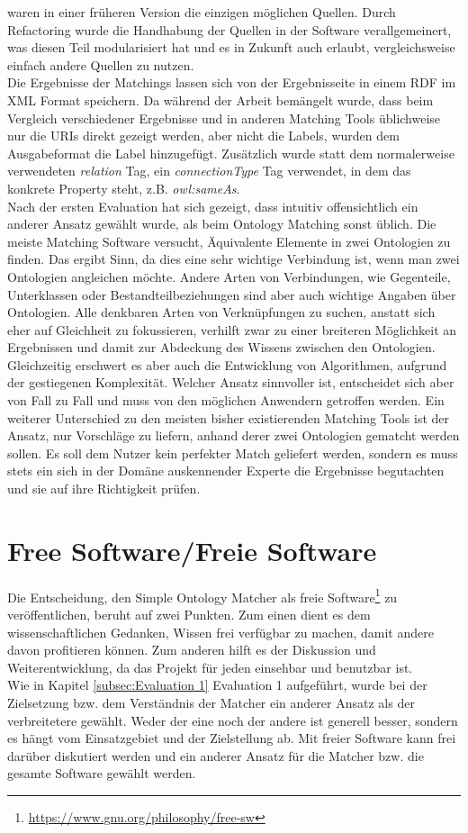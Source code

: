 waren in einer früheren Version die einzigen möglichen Quellen. Durch
Refactoring wurde die Handhabung der Quellen in der Software verallgemeinert,
was diesen Teil modularisiert hat und es in Zukunft auch erlaubt, vergleichsweise einfach andere
Quellen zu nutzen.\\
Die Ergebnisse der Matchings lassen sich von der Ergebnisseite in einem RDF
im XML Format speichern. Da während der Arbeit bemängelt wurde, dass beim
Vergleich verschiedener Ergebnisse und in anderen Matching Tools üblichweise nur
die URIs direkt gezeigt werden, aber nicht die Labels, wurden dem Ausgabeformat
die Label hinzugefügt. Zusätzlich wurde statt dem normalerweise verwendeten
\textit{relation} Tag, ein \textit{connectionType} Tag verwendet, in dem das
konkrete Property steht, z.B. \textit{owl:sameAs}.\\
Nach der ersten Evaluation hat sich gezeigt, dass intuitiv offensichtlich ein
anderer Ansatz gewählt wurde, als beim Ontology Matching sonst üblich. Die
meiste Matching Software versucht, Äquivalente Elemente in zwei Ontologien zu
finden. Das ergibt Sinn, da dies eine sehr wichtige Verbindung ist, wenn man
zwei Ontologien angleichen möchte. Andere Arten von Verbindungen, wie
Gegenteile, Unterklassen oder Bestandteilbeziehungen sind aber auch wichtige
Angaben über Ontologien. Alle denkbaren Arten von Verknüpfungen zu suchen,
anstatt sich eher auf Gleichheit zu fokussieren, verhilft zwar zu einer
breiteren Möglichkeit an Ergebnissen und damit zur Abdeckung des Wissens
zwischen den Ontologien. Gleichzeitig erschwert es aber auch die Entwicklung von
Algorithmen, aufgrund der gestiegenen Komplexität. Welcher Ansatz sinnvoller
ist, entscheidet sich aber von Fall zu Fall und muss von den möglichen Anwendern
getroffen werden. Ein weiterer Unterschied zu den meisten bisher existierenden
Matching Tools ist der Ansatz, nur Vorschläge zu liefern, anhand derer zwei
Ontologien gematcht werden sollen. Es soll dem Nutzer kein perfekter Match
geliefert werden, sondern es muss stets ein sich in der Domäne auskennender
Experte die Ergebnisse begutachten und sie auf ihre Richtigkeit prüfen.

\section{Free Software/Freie Software}
Die Entscheidung, den Simple Ontology Matcher als freie
Software\footnote{\url{https://www.gnu.org/philosophy/free-sw}} zu veröffentlichen, beruht auf zwei Punkten. Zum einen dient es dem
wissenschaftlichen Gedanken, Wissen frei verfügbar zu machen, damit andere davon
profitieren können. Zum anderen hilft es der Diskussion und Weiterentwicklung,
da das Projekt für jeden einsehbar und benutzbar ist.\\
Wie in Kapitel \ref{subsec:Evaluation 1} Evaluation 1 aufgeführt, wurde bei der
Zielsetzung bzw. dem Verständnis der Matcher ein anderer Ansatz als der
verbreitetere gewählt. Weder der eine noch der andere ist generell besser,
sondern es hängt vom Einsatzgebiet und der Zielstellung ab. Mit freier Software
kann frei darüber diskutiert werden und ein anderer Ansatz für die Matcher bzw.
die gesamte Software gewählt werden.

\cleardoublepage
\pagebreak[4]